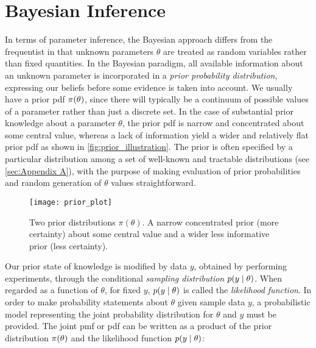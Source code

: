 \section{Bayesian Inference}\label{sec:bayes_paradigm}

In terms of parameter inference, the Bayesian approach differs from the frequentist in that unknown parameters $\theta$ are treated as random variables rather than fixed quantities. In the Bayesian paradigm, all available information about an unknown parameter is incorporated in a \textit{prior probability distribution}, expressing our beliefs before some evidence is taken into account. We usually have a prior pdf $\pi \qty(\theta)$, since there will typically be a continuum of possible values of a parameter rather than just a discrete set. In the case of substantial prior knowledge about a parameter $\theta$, the prior pdf is narrow and concentrated about some central value, whereas a lack of information yield a wider and relatively flat prior pdf as shown in \autoref{fig:prior_illustration}. The prior is often specified by a particular distribution among a set of well-known and tractable distributions (see \autoref{sec:Appendix A}), with the purpose of making evaluation of prior probabilities and random generation of $\theta$ values straightforward.



\begin{figure}[H]
    \centering
    \texttt{[image: prior\_plot]}
    \caption{Two prior distributions $\pi (\theta)$. A narrow concentrated prior (more certainty) about some central value and a wider less informative prior (less certainty).}
    \label{fig:prior_illustration}
\end{figure}

Our prior state of knowledge is modified by data $y$, obtained by performing experiments, through the conditional \textit{sampling distribution} $p \qty(y \mid \theta)$. When regarded as a function of $\theta$, for fixed $y$, $p \qty(y \mid \theta)$ is called the \textit{likelihood function}. In order to make probability statements about $\theta$ given sample data $y$, a probabilistic model representing the joint probability distribution for $\theta$ and $y$ must be provided. The joint pmf or pdf can be written as a product of the prior distribution $\pi \qty(\theta)$ and the likelihood function $p \qty(y \mid \theta)$:

